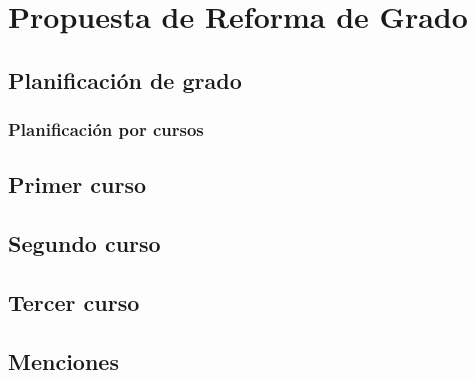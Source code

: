 \chapter{Propuesta de Reforma de Grado}\label{chap:proposal}


\section{Planificación de grado}

\subsection{Planificación por cursos}

\section{Primer curso}

\section{Segundo curso}

\section{Tercer curso}

\section{Menciones}

